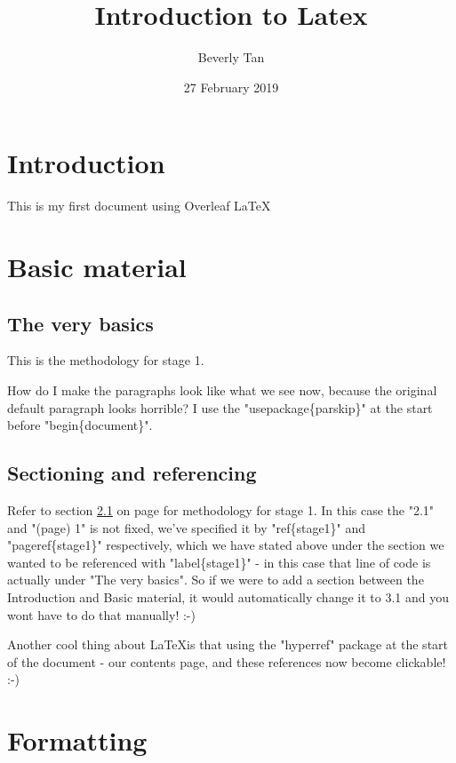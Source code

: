 \documentclass[a4paper, 12pt]{article}
\begin{document}
\title{Introduction to Latex}
\author{Beverly Tan}
\date{27 February 2019}
\maketitle

\tableofcontents
\newpage
{}

\section{Introduction}

This is my first document using Overleaf \LaTeX

\section{Basic material}

\subsection{The very basics}
\label{stage1}

This is the methodology for stage 1. 

How do I make the paragraphs look like what we see now, because the original default paragraph looks horrible? I use the "usepackage\{parskip\}" at the start before "begin\{document\}". 

\subsection{Sectioning and referencing}

Refer to section \ref{stage1} on page \pageref{stage1} for methodology for stage 1. In this case the "2.1" and "(page) 1" is not fixed, we've specified it by "ref\{stage1\}" and "pageref\{stage1\}" respectively, which we have stated above under the section we wanted to be referenced with "label\{stage1\}" - in this case that line of code is actually under "The very basics". So if we were to add a section between the Introduction and Basic material, it would automatically change it to 3.1 and you wont have to do that manually! :-) 

Another cool thing about \LaTeX is that using the "hyperref" package at the start of the document - our contents page, and these references now become clickable! :-) 

\newpage

\section{Formatting}
\end{document}
